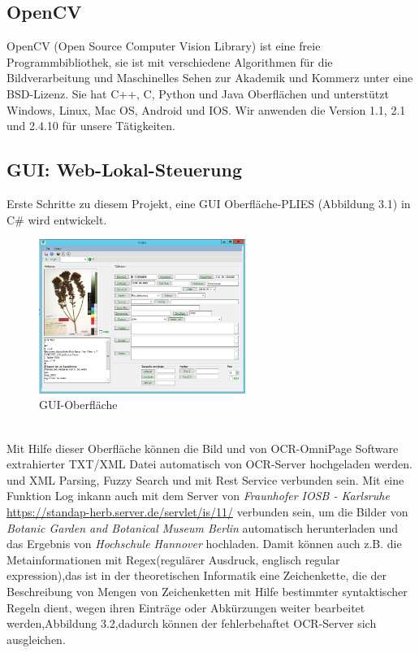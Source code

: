 \documentclass[10pt,a4paper]{report}
\begin{document}
\subsection{OpenCV}
OpenCV (Open Source Computer Vision Library) ist eine freie Programmbibliothek, sie ist mit verschiedene Algorithmen für die Bildverarbeitung und Maschinelles Sehen zur Akademik und Kommerz unter eine BSD-Lizenz. Sie hat C++, C, Python und Java Oberflächen und unterstützt Windows, Linux, Mac OS, Android und IOS. Wir anwenden die Version 1.1, 2.1 und 2.4.10 für unsere Tätigkeiten.
\subsection{GUI: Web-Lokal-Steuerung}
Erste Schritte zu diesem Projekt, eine GUI Oberfläche-PLIES (Abbildung 3.1) in C\# wird entwickelt. \\ 
\begin{figure}[htbp] 
	\centering
	\includegraphics[width=0.6\textwidth]{GUI.png}
	\caption{GUI-Oberfläche}
	\label{fig:Bild 3.1}
\end{figure}\\
Mit Hilfe dieser Oberfläche können die Bild und von OCR-OmniPage Software extrahierter TXT/XML Datei automatisch von OCR-Server hochgeladen werden.
und XML Parsing, Fuzzy Search und mit Rest Service verbunden sein. Mit eine Funktion \glqq Log in\grqq kann auch mit dem Server von \textit{Fraunhofer IOSB - Karlsruhe} \href{https://standap-herb.server.de/servlet/is/11/}{https://standap-herb.server.de/servlet/is/11/} verbunden sein, um die Bilder von \textit{Botanic Garden and Botanical Museum Berlin} automatisch herunterladen und das Ergebnis von \textit{Hochschule Hannover} hochladen. Damit können auch z.B. die Metainformationen mit Regex(regulärer Ausdruck, englisch regular expression),das ist in der theoretischen Informatik eine Zeichenkette, die der Beschreibung von Mengen von Zeichenketten mit Hilfe bestimmter syntaktischer Regeln dient, wegen ihren Einträge oder Abkürzungen weiter bearbeitet werden,Abbildung 3.2,dadurch können der fehlerbehaftet OCR-Server sich ausgleichen.\\
\end{document}
